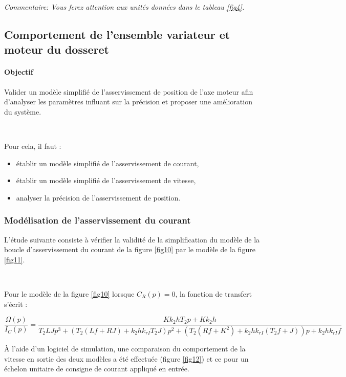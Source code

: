 
\textit{Commentaire: Vous ferez attention aux unités données dans le tableau \ref{fig4}.}

\subsection{Comportement de l'ensemble variateur et moteur du dosseret}

\paragraph{Objectif} Valider un modèle simplifié de l'asservissement de position de l'axe moteur afin d'analyser les paramètres influant sur la précision et proposer une amélioration du système.

~\

Pour cela, il faut :
\begin{itemize}
 \item établir un modèle simplifié de l'asservissement de courant,
 \item établir un modèle simplifié de l'asservissement de vitesse,
 \item analyser la précision de l'asservissement de position.
\end{itemize}

\subsubsection{Modélisation de l'asservissement du courant}

L'étude suivante consiste à vérifier la validité de la simplification du modèle de la boucle d'asservissement du courant de la figure \ref{fig10} par le modèle de la figure \ref{fig11}.

~\

Pour le modèle de la figure \ref{fig10} lorsque $C_R(p)=0$, la fonction de transfert s'écrit :

\begin{center}
$\dfrac{\Omega(p)}{I_C(p)}=\dfrac{Kk_2hT_2p+Kk_2h}{T_2LJp^3+(T_2(Lf+RJ)+k_2hk_{rI}T_2 J)p^2+(T_2(Rf+K^2)+k_2hk_{rI}(T_2f+J))p+k_2hk_{rI}f}$
\end{center}

À l'aide d'un logiciel de simulation, une comparaison du comportement de la vitesse en sortie des deux modèles a été effectuée (figure \ref{fig12}) et ce pour un échelon unitaire de consigne de courant appliqué en entrée.

